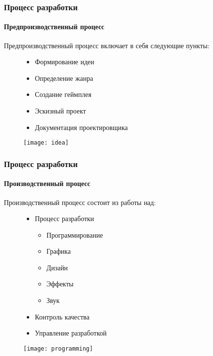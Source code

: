 \begin{frame}
    \frametitle{Процесс разработки}
    \framesubtitle{Предпроизводственный процесс}
    Предпроизводственный процесс включает в себя следующие пункты:
    \begin{figure}
        \begin{minipage}{0.47\textwidth}
            \begin{itemize}
                \item Формирование идеи
                \item Определение жанра
                \item Создание геймплея
                \item Эскизный проект
                \item Документация проектировщика
            \end{itemize}
        \end{minipage}
        \begin{minipage}{0.5\textwidth}
            \texttt{[image: idea]}
        \end{minipage}
    \end{figure}
\end{frame}

\begin{frame}
    \frametitle{Процесс разработки}
    \framesubtitle{Производственный процесс}
    Производственный процесс состоит из работы над:
    \begin{figure}
        \begin{minipage}{0.47\textwidth}
            \begin{itemize}
                \item Процесс разработки
                \begin{itemize}
                    \item Программирование
                    \item Графика
                    \item Дизайн
                    \item Эффекты
                    \item Звук
                \end{itemize}
                \item Контроль качества
                \item Управление разработкой
            \end{itemize}
        \end{minipage}
        \begin{minipage}{0.5\textwidth}
            \texttt{[image: programming]}
        \end{minipage}
    \end{figure}
\end{frame}

